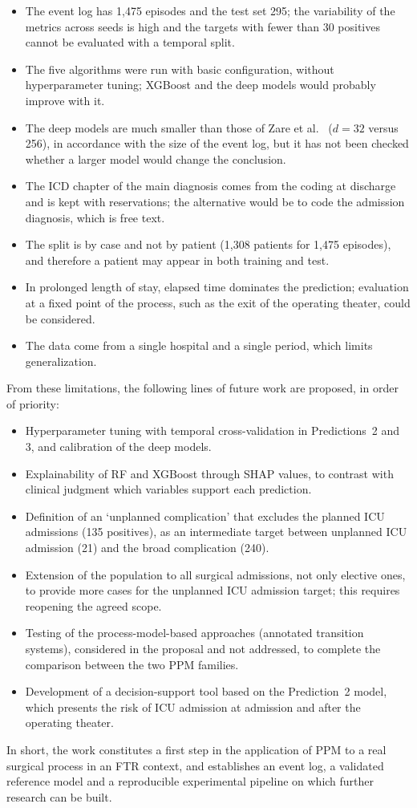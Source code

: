\begin{itemize}[leftmargin=*]
  \item The event log has 1,475 episodes and the test set 295; the variability of the metrics across seeds is high and the targets with fewer than 30 positives cannot be evaluated with a temporal split.
  \item The five algorithms were run with basic configuration, without hyperparameter tuning; XGBoost and the deep models would probably improve with it.
  \item The deep models are much smaller than those of Zare et al.\ \cite{zare2025} ($d = 32$ versus 256), in accordance with the size of the event log, but it has not been checked whether a larger model would change the conclusion.
  \item The ICD chapter of the main diagnosis comes from the coding at discharge and is kept with reservations; the alternative would be to code the admission diagnosis, which is free text.
  \item The split is by case and not by patient (1,308 patients for 1,475 episodes), and therefore a patient may appear in both training and test.
  \item In prolonged length of stay, elapsed time dominates the prediction; evaluation at a fixed point of the process, such as the exit of the operating theater, could be considered.
  \item The data come from a single hospital and a single period, which limits generalization.
\end{itemize}

From these limitations, the following lines of future work are proposed, in order of priority:

\begin{itemize}[leftmargin=*]
  \item Hyperparameter tuning with temporal cross-validation in Predictions~2 and 3, and calibration of the deep models.
  \item Explainability of RF and XGBoost through SHAP values, to contrast with clinical judgment which variables support each prediction.
  \item Definition of an `unplanned complication' that excludes the planned ICU admissions (135 positives), as an intermediate target between unplanned ICU admission (21) and the broad complication (240).
  \item Extension of the population to all surgical admissions, not only elective ones, to provide more cases for the unplanned ICU admission target; this requires reopening the agreed scope.
  \item Testing of the process-model-based approaches (annotated transition systems), considered in the proposal and not addressed, to complete the comparison between the two PPM families.
  \item Development of a decision-support tool based on the Prediction~2 model, which presents the risk of ICU admission at admission and after the operating theater.
\end{itemize}

In short, the work constitutes a first step in the application of PPM to a real surgical process in an FTR context, and establishes an event log, a validated reference model and a reproducible experimental pipeline on which further research can be built.
